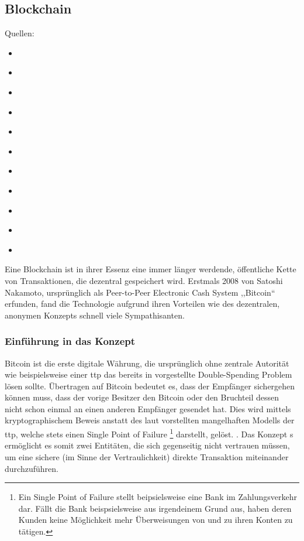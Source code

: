 \subsection{Blockchain}
\label{sec:sota_blockchain}

    Quellen:
    \begin{itemize}[noitemsep]
        \item \cite{Dorri2016}
        \item \cite{Conoscenti2016}
        \item \cite{Greenspan2015}
        \item \cite{ISO307}
        \item \cite{Kshetri2017}
        \item \cite{Nakamoto2008}
        \item \cite{Underwood2016}
        \item \cite{Vukolic2016}
        \item \cite{Vukolic2017}
        \item \cite{Wuest2017}
        \item \cite{Zheng2017}
    \end{itemize}
    
    Eine Blockchain ist in ihrer Essenz eine immer länger werdende, öffentliche Kette von Transaktionen, die dezentral gespeichert wird. 
    Erstmals 2008 von Satoshi Nakamoto, ursprünglich als Peer-to-Peer Electronic Cash System ,,Bitcoin`` erfunden, fand die Technologie aufgrund ihren Vorteilen wie des dezentralen, anonymen Konzepts schnell viele Sympathisanten. 
    
    \subsubsection{Einführung in das Konzept}
    \label{sec:sota_blockchain_introduction}
    Bitcoin ist die erste digitale Währung, die ursprünglich ohne zentrale Autorität wie beispielsweise einer \gls{ttp} das bereits in  vorgestellte Double-Spending Problem lösen sollte\cite{Nakamoto2008}. 
    Übertragen auf Bitcoin bedeutet es, dass der Empfänger sichergehen können muss, dass der vorige Besitzer den Bitcoin oder den Bruchteil dessen nicht schon einmal an einen anderen Empfänger gesendet hat.
    Dies wird mittels kryptographischem Beweis anstatt des laut \citeauthor{Nakamoto2008} vorstellten mangelhaften Modells der \gls{ttp}, welche stets einen Single Point of Failure
    \footnote{Ein Single Point of Failure stellt beipsielsweise eine Bank im Zahlungsverkehr dar.
    Fällt die Bank beispsielsweise aus irgendeinem Grund aus, haben deren Kunden keine Möglichkeit mehr Überweisungen von und zu ihren Konten zu tätigen.}
    darstellt, gelöst. 
    .
    Das Konzept \citeauthor{Nakamoto2008}s ermöglicht es somit zwei Entitäten, die sich gegenseitig nicht vertrauen müssen, um eine sichere (im Sinne der Vertraulichkeit) direkte Transaktion miteinander durchzuführen.
    
